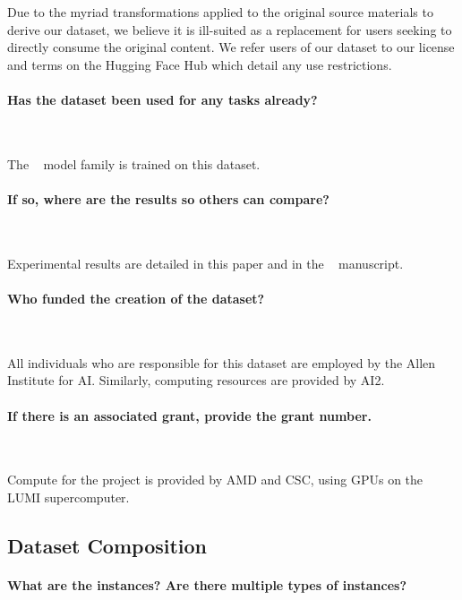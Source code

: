 Due to the myriad transformations applied to the original source materials to derive our dataset, we believe it is ill-suited as a replacement for users seeking to directly consume the original content. 
We refer users of our dataset to our license and terms on the Hugging Face Hub \href{https://huggingface.co/datasets/allenai/dolma}{} which detail any use restrictions.


\paragraph{Has the dataset been used for any tasks already?}~

The \olmo~\citep{olmo20247b} model family is trained on this dataset. 

\paragraph{If so, where are the results so others can compare?}~

Experimental results are detailed in this paper and in the \olmo~\citep{olmo20247b} manuscript.

\paragraph{Who funded the creation of the dataset?}~

All individuals who are responsible for this dataset are employed by the Allen Institute for AI. Similarly, computing resources are provided by AI2. 

\paragraph{If there is an associated grant, provide the grant number.}~

Compute for the \olmo project is provided by AMD and CSC, using GPUs on the LUMI supercomputer.

\subsection{Dataset Composition}


\paragraph{What are the instances? Are there multiple types of instances?}~

